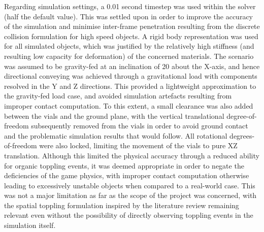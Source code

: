 \documentclass[10pt]{article}
\begin{document}
Regarding simulation settings, a 0.01 second timestep was used within the solver (half the default value). This was settled upon in order to improve the accuracy of the simulation and minimise inter-frame penetration resulting from the discrete collision formulation for high speed objects. A rigid body representation was used for all simulated objects, which was justified by the relatively high stiffness (and resulting low capacity for deformation) of the concerned materials. The scenario was assumed to be gravity-fed at an inclination of 20\degree{} about the X-axis, and hence directional conveying was achieved through a gravitational load with components resolved in the Y and Z directions. This provided a lightweight approximation to the gravity-fed load case, and avoided simulation artefacts resulting from improper contact computation. To this extent, a small clearance was also added between the vials and the ground plane, with the vertical translational degree-of-freedom subsequently removed from the vials in order to avoid ground contact and the problematic simulation results that would follow. All rotational degrees-of-freedom were also locked, limiting the movement of the vials to pure XZ translation. Although this limited the physical accuracy through a reduced ability for organic toppling events, it was deemed appropriate in order to negate the deficiencies of the game physics, with improper contact computation otherwise leading to excessively unstable objects when compared to a real-world case. This was not a major limitation as far as the scope of the project was concerned, with the spatial toppling formulation inspired by the literature review remaining relevant even without the possibility of directly observing toppling events in the simulation itself.
\end{document}
